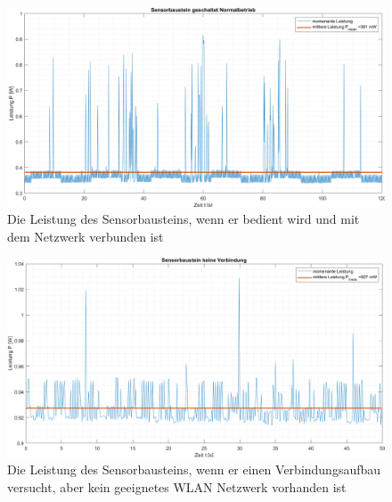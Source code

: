 \begin{figure}[H]
	\centering
	\includegraphics[width=1\textwidth]{graphics/Sensorbaustein_geschaltet.png}
	\caption{Die Leistung des Sensorbausteins, wenn er bedient wird und mit dem Netzwerk verbunden ist}
	\label{pic: Sensorbaustein_geschaltet}
\end{figure}

\begin{figure}[H]
	\centering
	\includegraphics[width=1\textwidth]{graphics/Sensorbaustein_keine_Verbindung.png}
	\caption{Die Leistung des Sensorbausteins, wenn er einen Verbindungsaufbau versucht, aber kein geeignetes WLAN Netzwerk vorhanden ist}
	\label{pic: Sensorbaustein_keine_Verbindung}
\end{figure}





